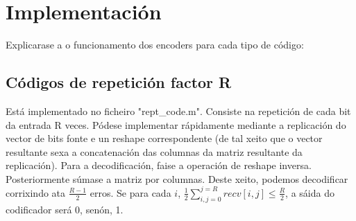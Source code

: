 \documentclass[
	10pt, %
	spanish, %
]{fphw}
\begin{document}
\section*{Implementación}
Explicarase a o funcionamento dos encoders para cada tipo de código:
\subsection*{Códigos de repetición factor R} 
Está implementado no ficheiro "rept\_code.m". Consiste na repetición de cada bit da entrada R veces. Pódese implementar rápidamente mediante a replicación do vector de bits fonte e un reshape correspondente (de tal xeito que o vector resultante sexa a concatenación das columnas da matriz resultante da replicación). Para a decodificación, faise a operación de reshape inversa. Posteriormente súmase a matriz por columnas. Deste xeito, podemos decodificar corrixindo ata $\frac{R-1}{2}$ erros. Se para cada $i$, $\frac{1}{2} \sum_{i, j=0}^{j=R} recv[i,j] \leq \frac{R}{2}$, a sáida do codificador será 0, senón, 1.
\end{document}
